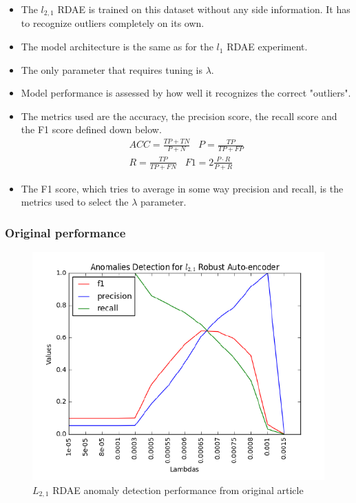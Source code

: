 \documentclass{beamer}
\theoremstyle{plain}
\theoremstyle{definition}
\theoremstyle{remark}
\begin{document}
\begin{frame}
	\begin{itemize}
		\item The $l_{2,1}$ RDAE is trained on this dataset without any side information. It has to recognize outliers completely on its own.
		\item The model architecture is the same as for the $l_1$ RDAE experiment.
		\item The only parameter that requires tuning is $\lambda$.
	\end{itemize}
\end{frame}

\begin{frame}
	\begin{itemize}
		\item Model performance is assessed by how well it recognizes the correct "outliers".
		\item The metrics used are the accuracy, the precision score, the recall score and the F1 score defined down below.
			\begin{align}
				ACC = \frac{TP+TN}{P+N}\;\;\; P = \frac{TP}{TP+FP}\\
				R = \frac{TP}{TP+FN} \;\;\; F1 = 2\frac{P\cdot R}{P+R}
			\end{align}
		\item The F1 score, which tries to average in some way precision and recall, is the metrics used to select the $\lambda$ parameter.
	\end{itemize}
\end{frame}

\begin{frame}
	\frametitle{Original performance}
	\begin{figure}
		\centering
		\includegraphics[width=0.7\linewidth]{Images/l21_perf_article.png}
		\caption[]{$L_{2,1}$ RDAE anomaly detection performance from original article}
	\end{figure}
\end{frame}
\end{document}
